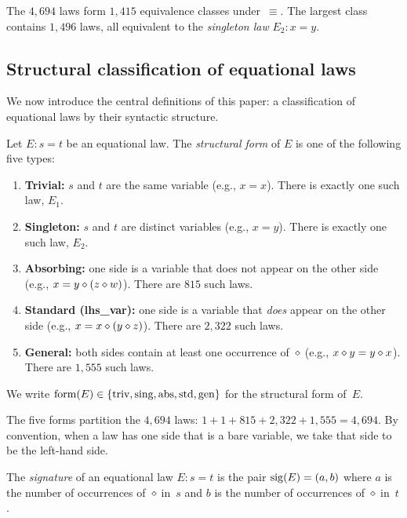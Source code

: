 The $4{,}694$ laws form $1{,}415$ equivalence classes under~$\equiv$.  The
largest class contains $1{,}496$ laws, all equivalent to the \emph{singleton
law} $E_2 \colon x = y$.

\subsection{Structural classification of equational laws}

We now introduce the central definitions of this paper: a classification of
equational laws by their syntactic structure.

\begin{definition}\label{def:form}
Let $E \colon s = t$ be an equational law.  The \emph{structural form} of $E$
is one of the following five types:
\begin{enumerate}[label=(\roman*)]
\item \textbf{Trivial:} $s$ and $t$ are the same variable (e.g., $x = x$).
  There is exactly one such law, $E_1$.
\item \textbf{Singleton:} $s$ and $t$ are distinct variables (e.g., $x = y$).
  There is exactly one such law, $E_2$.
\item \textbf{Absorbing:} one side is a variable that does not appear on the
  other side (e.g., $x = y \diamond (z \diamond w)$).  There are $815$ such laws.
\item \textbf{Standard (lhs\_var):} one side is a variable that \emph{does}
  appear on the other side (e.g., $x = x \diamond (y \diamond z)$).  There are $2{,}322$
  such laws.
\item \textbf{General:} both sides contain at least one occurrence of~$\diamond$
  (e.g., $x \diamond y = y \diamond x$).  There are $1{,}555$ such laws.
\end{enumerate}
We write $\mathrm{form}(E) \in \{\text{triv}, \text{sing}, \text{abs}, \text{std},
\text{gen}\}$ for the structural form of~$E$.
\end{definition}

\begin{remark}\label{rem:form-partition}
The five forms partition the $4{,}694$ laws:
$1 + 1 + 815 + 2{,}322 + 1{,}555 = 4{,}694$.  By convention, when a law has
one side that is a bare variable, we take that side to be the left-hand side.
\end{remark}

\begin{definition}\label{def:signature}
The \emph{signature} of an equational law $E \colon s = t$ is the pair
$\mathrm{sig}(E) = (a, b)$ where $a$ is the number of occurrences of~$\diamond$ in~$s$ and
$b$ is the number of occurrences of~$\diamond$ in~$t$.
\end{definition}

